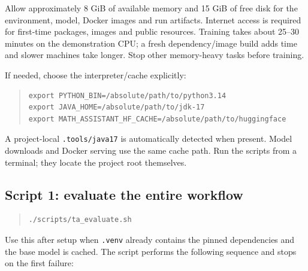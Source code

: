 \documentclass[11pt,a4paper]{article}
\begin{document}
Allow approximately 8 GiB of available memory and 15 GiB of free disk for the environment, model, Docker images and run artifacts. Internet access is required for first-time packages, images and public resources. Training takes about 25--30 minutes on the demonstration CPU; a fresh dependency/image build adds time and slower machines take longer. Stop other memory-heavy tasks before training.

If needed, choose the interpreter/cache explicitly:

\begin{quote}\small
\begin{verbatim}
export PYTHON_BIN=/absolute/path/to/python3.14
export JAVA_HOME=/absolute/path/to/jdk-17
export MATH_ASSISTANT_HF_CACHE=/absolute/path/to/huggingface
\end{verbatim}
\end{quote}
A project-local \texttt{.\allowbreak{}tools/\allowbreak{}java17} is automatically detected when present. Model downloads and Docker serving use the same cache path. Run the scripts from a terminal; they locate the project root themselves.

\subsection*{Script 1: evaluate the entire workflow}
\begin{quote}\small
\begin{verbatim}
./scripts/ta_evaluate.sh
\end{verbatim}
\end{quote}
Use this after setup when \texttt{.\allowbreak{}venv} already contains the pinned dependencies and the base model is cached. The script performs the following sequence and stops on the first failure:
\end{document}

